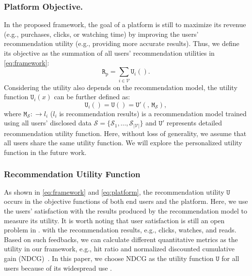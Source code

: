 \subsubsection{\textbf{Platform Objective.}}
\label{sec:platform_obj}
In the proposed framework, the goal of a platform is still to maximize its revenue (e.g., purchases, clicks, or watching time) by improving the users' recommendation utility (e.g., providing more accurate results).
Thus, we define its objective as the summation of all users' recommendation utilities in \cref{eq:framework}:
\begin{equation}
    \texttt{R}_{\text{p}} = \sum_{i \in {\scriptstyle \mathcal{V}}} \texttt{U}_i(\si{}).
\label{eq:platform}
\end{equation}
Considering the utility also depends on the recommendation model, the utility function $\texttt{U}_i(x)$ can be further defined as:
\begin{equation}
    \texttt{U}_i(\si{}) = \texttt{U}(\si{}) = \texttt{U}'(\si{},\, \texttt{M}_{{\scriptscriptstyle \mathcal{S}}}),
    \label{eq:updated_rec}
\end{equation}
where $\texttt{M}_{{\scriptscriptstyle \mathcal{S}}}: \si{} \rightarrow l_i$ ($l_i$ is recommendation results) is a recommendation model trained using all users' disclosed data ${\scriptstyle \mathcal{S}}=\{ {\scriptstyle \mathcal{S}_1},\dots, {\scriptstyle \mathcal{S}_{|\mathcal{V}|}}\}$ and $\texttt{U}'$ represents detailed recommendation utility function.
Here, without loss of generality, we assume that all users share the same utility function.
We will explore the personalized utility function in the future work.


\subsubsection{\textbf{Recommendation Utility Function}}
As shown in \cref{eq:framework} and \cref{eq:platform}, the recommendation utility $\texttt{U}$  occurs in the objective functions of both end users and the platform.
Here, we use the users' satisfaction with the results produced by the recommendation model to measure its utility.
It is worth noting that user satisfaction is still an open problem in .
 with the recommendation results, e.g., clicks, watches, and reads.
Based on such feedbacks, we can calculate different quantitative metrics as the utility in our framework, e.g., hit ratio and normalized discounted cumulative gain (NDCG)~\cite{ndcg}.
In this paper, we choose NDCG as the utility function $\texttt{U}$ for all users because of its widespread use \cite{NCF,kang2018self,Sun:cikm19:BERT4Rec}.


